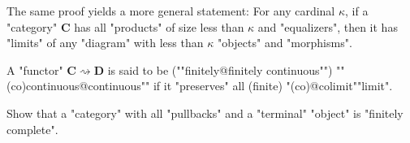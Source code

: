 \documentclass[main.tex]{subfiles}
\begin{document}
\begin{rem}\label{rem:prodeqcomplete}
    The same proof yields a more general statement: For any cardinal $\kappa$, if a "category" $\mathbf{C}$ has all "products" of size less than $\kappa$ and "equalizers", then it has "limits" of any "diagram" with less than $\kappa$ "objects" and "morphisms". 
\end{rem}

\begin{defn}
    \AP A "functor" $\mathbf{C} \rightsquigarrow \mathbf{D}$ is said to be (""finitely@finitely continuous"") ""(co)continuous@continuous"" if it "preserves" all (finite) "(co)@colimit""limit".
\end{defn}
\begin{exer}\label{exer:limits:termpullcomplete}
    Show that a "category" with all "pullbacks" and a "terminal" "object" is "finitely complete".
\end{exer}
\end{document}
